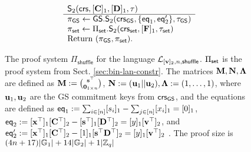 \begin{figure}
\begin{\algSize}
$$\begin{array}{l}
\begin{array}{l}
\\
\end{array}
\\
\begin{array}{l}
{\mathsf{S}_2(\mathsf{crs},[\mathbf{{C}}]_1,[\mathbf{{D}}]_1,\tau)}\\
\hline
\pi_{\mathsf{GS}}\gets {\mathsf{GS}}.\mathsf{S}_2(\mathsf{crs}_{\mathsf{GS}},\{\mathsf{eq}_1,\mathsf{eq}'_2\},\tau_{\mathsf{GS}})\\
\pi_{\mathsf{set}}\gets \Pi_{\mathsf{set}}.\mathsf{S}_2(\mathsf{crs}_{\mathsf{set}},[\mathbf{{F}}]_1,\tau_{\mathsf{set}})\\
\text{Return }  (\pi_{\mathsf{GS}},\pi_{\mathsf{set}}).
\end{array}
\end{array}
$$
\end{\algSize}
\caption{The proof system $\Pi_\mathsf{shuffle}$ for the language $\mathcal{L}_{[\mathbf{v}]_2,n,\mathsf{shuffle}}$. $\Pi_{\mathsf{set}}$ is the proof system from Sect. \ref{sec:bin-lan-constr}. The matrices $\mathbf{{M}},\mathbf{{N}},\mathbf{{\Lambda}}$ are defined as
$\mathbf{{M}}:=\binom{\mathbf{s}^\top}{\mathbf{{0}}_{1\times n}}$,
$\mathbf{{N}}:=(\mathbf{u}_1||\mathbf{u}_2),\mathbf{{\Lambda}}:= (1,\ldots,1)$, where $\mathbf{u}_1,\mathbf{u}_2$ are the GS commitment keys from $\mathsf{crs}_{\mathsf{GS}}$, and the equations are defined as $\mathsf{eq}_1:= \sum_{i\in[n]}[s_i]_1-\sum_{j\in[n]}[{x}_i]_1 = [0]_1$, $\mathsf{eq}_2:= [\mathbf{x}^\top]_1[\mathbf{{C}}^\top]_2-[\mathbf{s}^\top]_1[\mathbf{{D}}^\top]_2=[y]_1[\mathbf{v}^\top]_2$, and $\mathsf{eq}'_2:= [\mathbf{x}^\top]_1[\mathbf{{C}}^\top]_2-[1]_1[\mathbf{s}^\top\mathbf{{D}}^\top]_2=[y]_1[\mathbf{v}^\top]_2$   
. The proof size is $(4n+17)|\mathbb{G}_1|+14|\mathbb{G}_2|+1|\mathbb{Z}_q|$
\label{fig:shuffles}}
\end{figure}
